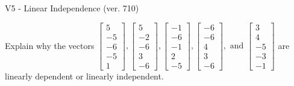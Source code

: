 \begin{exercise}
  \begin{exerciseTitle}V5 - Linear Independence (ver. 710)\end{exerciseTitle}
  \begin{exerciseStatement}
    Explain why the vectors \(\left[\begin{array}{r}
5 \\
-5 \\
-6 \\
-5 \\
1
\end{array}\right] , \left[\begin{array}{r}
5 \\
-2 \\
-6 \\
3 \\
-6
\end{array}\right] , \left[\begin{array}{r}
-1 \\
-6 \\
-1 \\
2 \\
-5
\end{array}\right] , \left[\begin{array}{r}
-6 \\
-6 \\
4 \\
3 \\
-6
\end{array}\right] , \text{ and } \left[\begin{array}{r}
3 \\
4 \\
-5 \\
-3 \\
-1
\end{array}\right]\) are linearly dependent or linearly independent.	



\end{exerciseStatement}
\end{exercise}
